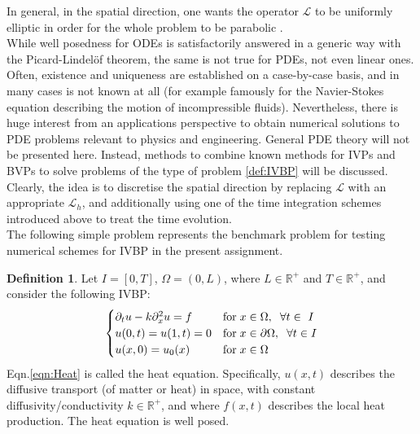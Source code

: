 \documentclass[11pt]{article}
\theoremstyle{theorem}
\theoremstyle{definition}
\newtheorem{definition}{Definition}
\begin{document}
In general, in the spatial direction, one wants the operator $\mathcal{L}$ to be uniformly elliptic in order for the whole problem to be parabolic .\\

While well posedness for ODEs is satisfactorily answered in a generic way with the Picard-Lindelöf theorem, the same is not true for PDEs, not even linear ones. Often,
existence and uniqueness are established on a case-by-case basis, and in many cases is not known at all (for example famously for the Navier-Stokes equation describing the motion of incompressible fluids). Nevertheless, there is huge interest from an applications perspective to obtain numerical solutions to PDE problems relevant to physics and
engineering. General PDE theory will not be presented here. Instead, methods to combine known methods for IVPs and BVPs to solve problems of the type of problem \ref{def:IVBP} will be discussed. Clearly, the idea is to discretise the spatial direction by replacing $\mathcal{L}$ with an appropriate $\mathcal{L}_h$, and additionally using one of the time integration schemes introduced above to treat the time evolution.\\

The following simple problem represents the benchmark problem for testing numerical schemes for IVBP in the present assignment.\\

\begin{definition}
	\label{def:Heat}
	Let $I=[0,T]$, $\Omega=(0,L)$, where $L\in\mathbb{R}^+$ and $T\in\mathbb{R}^+$, and consider the following IVBP:
	\begin{align}
	\label{eqn:Heat}
	\begin{cases}
	\partial_t u - k\partial^2_x u = f &\text{for}\hspace{1mm}x\in\Omega,\hspace{2mm}\forall t\in\ I\\
	u(0, t)=u(1, t)=0 &\text{for}\hspace{1mm}x\in\partial\Omega,\hspace{2mm}\forall t\in I\\
	u(x,0)=u_0(x) &\text{for}\hspace{1mm}x\in\Omega
	\end{cases}
	\end{align} 
	Eqn.\eqref{eqn:Heat} is called the heat equation. Specifically, $u(x,t)$ 	describes the diffusive transport (of matter or heat) in space, with constant diffusivity/conductivity $k\in\mathbb{R}^+$, and where $f(x,t)$ describes
	the local heat production. The heat equation is well posed.\\
\end{definition}
\end{document}
